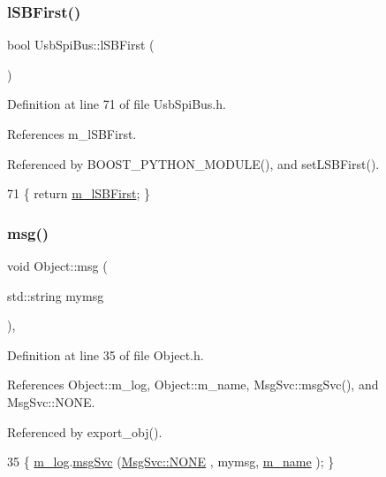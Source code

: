 \subsubsection{\texorpdfstring{l\+S\+B\+First()}{lSBFirst()}}
{\footnotesize\ttfamily bool Usb\+Spi\+Bus\+::l\+S\+B\+First (\begin{DoxyParamCaption}{ }\end{DoxyParamCaption})\hspace{0.3cm}{\ttfamily [inline]}}



Definition at line 71 of file Usb\+Spi\+Bus.\+h.



References m\+\_\+l\+S\+B\+First.



Referenced by B\+O\+O\+S\+T\+\_\+\+P\+Y\+T\+H\+O\+N\+\_\+\+M\+O\+D\+U\+L\+E(), and set\+L\+S\+B\+First().


\begin{DoxyCode}
71 \{ \textcolor{keywordflow}{return} \hyperlink{classUsbSpiBus_a23011787b0425356b011bc7a1c7cff5b}{m\_lSBFirst}; \}
\end{DoxyCode}
\mbox{\label{classObject_a58b2d0618c2d08cf2383012611528d97}} 
\subsubsection{\texorpdfstring{msg()}{msg()}\hspace{0.1cm}{\footnotesize\ttfamily [1/2]}}
{\footnotesize\ttfamily void Object\+::msg (\begin{DoxyParamCaption}\item[{std\+::string}]{mymsg }\end{DoxyParamCaption})\hspace{0.3cm}{\ttfamily [inline]}, {\ttfamily [inherited]}}



Definition at line 35 of file Object.\+h.



References Object\+::m\+\_\+log, Object\+::m\+\_\+name, Msg\+Svc\+::msg\+Svc(), and Msg\+Svc\+::\+N\+O\+NE.



Referenced by export\+\_\+obj().


\begin{DoxyCode}
35 \{ \hyperlink{classObject_a0d269813dd7ac1f24bc143031e2963f2}{m\_log}.\hyperlink{classMsgSvc_ad25f18047920cc59a314e5098259711c}{msgSvc} (\hyperlink{classMsgSvc_ae671eb7301996cd049d2da8a65925926a9be9ae32fed8e1e6eba4a58692210fbd}{MsgSvc::NONE}    , mymsg, \hyperlink{classObject_a8b83c95c705d2c3ba0d081fe1710f48d}{m\_name} ); \}
\end{DoxyCode}
\mbox{\label{classObject_ac5d59299273cee27aacf7de00d2e7034}} 
